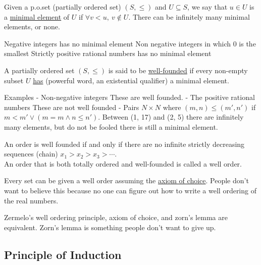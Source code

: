 \documentclass[../598comp.tex]{subfiles}
\begin{document}
\begin{definition}
  Given a p.o.set (partially ordered set) $(S, \leq)$ and $U \subseteq S$, we say that $u \in U$ is a \ul{minimal element} of $U$ if $\forall v < u, \ v \notin U$. There can be infinitely many minimal elements, or none. 
  \begin{example}
    \ii[]
    \ii
    Negative integers has no minimal element
    \ii
    Non negative integers in which 0 is the smallest
    \ii
    Strictly positive rational numbers has no minimal element
  \end{example} 
  A partially ordered set $(S, \leq)$ is said to be \ul{well-founded} if every non-empty subset $U$ \ul{has} (powerful word, an existential qualifier) a minimal element. 
\end{definition} 

\begin{example}
  Examples
  - Non-negative integers
    These are well founded.
  - The positive rational numbers
    These are not well founded
  - Pairs $N \times N$ where $(m, n) \leq (m', n')$ if $m < m' \vee (m = m \wedge n \leq n').$
    Between (1, 17) and (2, 5) there are infinitely many elements, but do not be fooled there is still a minimal element.
\end{example} 
 

\begin{fact}
  An order is well founded if and only if there are no infinite strictly decreasing sequences (chain) $x_1 > x_2 > x_3 > \cdots$.
  \\
  An order that is both totally ordered and well-founded is called a well order.
\end{fact} 



\begin{theorem}
  Every set can be given a well order assuming the \ul{axiom of choice}. People don't want to believe this because no one can figure out how to write a well ordering of the real numbers.
\end{theorem} 
\begin{note}
  Zermelo's well ordering principle, axiom of choice, and zorn's lemma are equivalent.
  Zorn's lemma is something people don't want to give up.
\end{note} 

\subsection{Principle of Induction}
\end{document}

